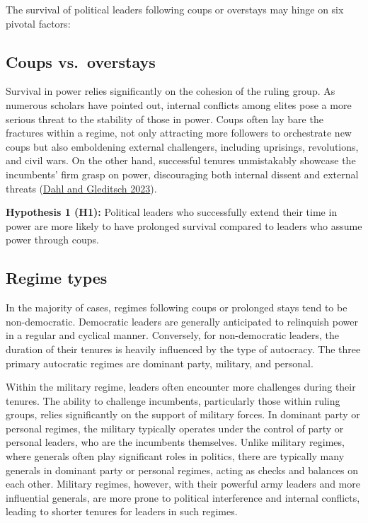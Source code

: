 \documentclass[
  12pt,
  a4paper,
  DIV=11,
  numbers=noendperiod]{scrartcl}
\begin{document}
The survival of political leaders following coups or overstays may hinge
on six pivotal factors:

\hypertarget{coups-vs.-overstays}{%
\subsection{Coups vs.~overstays}\label{coups-vs.-overstays}}

Survival in power relies significantly on the cohesion of the ruling
group. As numerous scholars have pointed out, internal conflicts among
elites pose a more serious threat to the stability of those in power.
Coups often lay bare the fractures within a regime, not only attracting
more followers to orchestrate new coups but also emboldening external
challengers, including uprisings, revolutions, and civil wars. On the
other hand, successful tenures unmistakably showcase the incumbents'
firm grasp on power, discouraging both internal dissent and external
threats (\protect\hyperlink{ref-dahl2023}{Dahl and Gleditsch 2023}).

\textbf{Hypothesis 1 (H1):} Political leaders who successfully extend
their time in power are more likely to have prolonged survival compared
to leaders who assume power through coups.

\hypertarget{regime-types}{%
\subsection{Regime types}\label{regime-types}}

In the majority of cases, regimes following coups or prolonged stays
tend to be non-democratic. Democratic leaders are generally anticipated
to relinquish power in a regular and cyclical manner. Conversely, for
non-democratic leaders, the duration of their tenures is heavily
influenced by the type of autocracy. The three primary autocratic
regimes are dominant party, military, and personal.

Within the military regime, leaders often encounter more challenges
during their tenures. The ability to challenge incumbents, particularly
those within ruling groups, relies significantly on the support of
military forces. In dominant party or personal regimes, the military
typically operates under the control of party or personal leaders, who
are the incumbents themselves. Unlike military regimes, where generals
often play significant roles in politics, there are typically many
generals in dominant party or personal regimes, acting as checks and
balances on each other. Military regimes, however, with their powerful
army leaders and more influential generals, are more prone to political
interference and internal conflicts, leading to shorter tenures for
leaders in such regimes.
\end{document}
